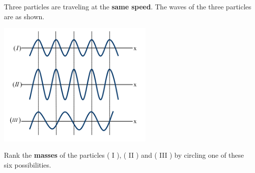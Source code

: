 \documentclass[addpoints,12pt]{exam}
\begin{document}
\begin{questions}

\question[2] Three particles are traveling at the \textbf{same speed}. The waves of the three particles are as shown.
	\begin{center}
		\includegraphics[width=3in]{../images/deBroglie.png}
	\end{center}
	Rank the \textbf{masses} of the particles ( I ), ( II ) and ( III ) by circling one of these six possibilities.


\end{questions}
\end{document}
